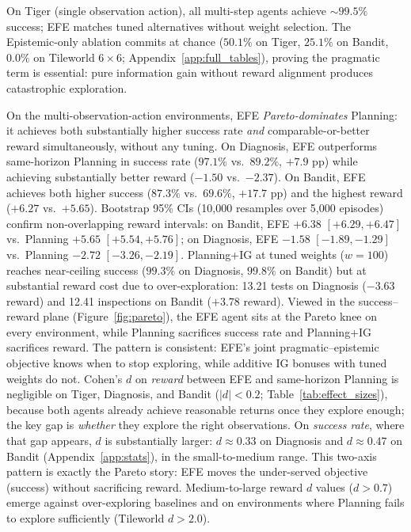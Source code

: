 \documentclass{article}
\begin{document}
On Tiger (single observation action), all multi-step agents achieve ${\sim}99.5\%$ success; EFE matches tuned alternatives without weight selection. The Epistemic-only ablation commits at chance ($50.1\%$ on Tiger, $25.1\%$ on Bandit, $0.0\%$ on Tileworld $6{\times}6$; Appendix~\ref{app:full_tables}), proving the pragmatic term is essential: pure information gain without reward alignment produces catastrophic exploration.

On the multi-observation-action environments, EFE \emph{Pareto-dominates} Planning: it achieves both substantially higher success rate \emph{and} comparable-or-better reward simultaneously, without any tuning. On Diagnosis, EFE outperforms same-horizon Planning in success rate ($97.1\%$ vs.\ $89.2\%$, $+7.9$ pp) while achieving substantially better reward ($-1.50$ vs.\ $-2.37$). On Bandit, EFE achieves both higher success ($87.3\%$ vs.\ $69.6\%$, $+17.7$ pp) and the highest reward ($+6.27$ vs.\ $+5.65$). Bootstrap 95\% CIs (10{,}000 resamples over 5{,}000 episodes) confirm non-overlapping reward intervals: on Bandit, EFE $+6.38$ $[+6.29, +6.47]$ vs.\ Planning $+5.65$ $[+5.54, +5.76]$; on Diagnosis, EFE $-1.58$ $[-1.89, -1.29]$ vs.\ Planning $-2.72$ $[-3.26, -2.19]$. Planning+IG at tuned weights ($w{=}100$) reaches near-ceiling success ($99.3\%$ on Diagnosis, $99.8\%$ on Bandit) but at substantial reward cost due to over-exploration: 13.21 tests on Diagnosis ($-3.63$ reward) and 12.41 inspections on Bandit ($+3.78$ reward). Viewed in the success--reward plane (Figure~\ref{fig:pareto}), the EFE agent sits at the Pareto knee on every environment, while Planning sacrifices success rate and Planning+IG sacrifices reward. The pattern is consistent: EFE's joint pragmatic--epistemic objective knows when to stop exploring, while additive IG bonuses with tuned weights do not. Cohen's $d$ on \emph{reward} between EFE and same-horizon Planning is negligible on Tiger, Diagnosis, and Bandit ($|d| < 0.2$; Table~\ref{tab:effect_sizes}), because both agents already achieve reasonable returns once they explore enough; the key gap is \emph{whether} they explore the right observations. On \emph{success rate}, where that gap appears, $d$ is substantially larger: $d \approx 0.33$ on Diagnosis and $d \approx 0.47$ on Bandit (Appendix~\ref{app:stats}), in the small-to-medium range. This two-axis pattern is exactly the Pareto story: EFE moves the under-served objective (success) without sacrificing reward. Medium-to-large reward $d$ values ($d > 0.7$) emerge against over-exploring baselines and on environments where Planning fails to explore sufficiently (Tileworld $d > 2.0$).
\end{document}
